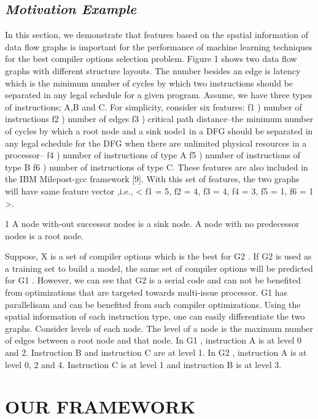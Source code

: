 \documentclass[conference]{IEEEtran}
\begin{document}
\subsection{\textit{Motivation Example}}
In this section, we demonstrate that features based on the spatial information of data flow graphs is important for the performance of machine learning techniques for the best compiler options selection problem. Figure 1 shows two data flow graphs with different structure layouts. The number besides an edge is latency which is the minimum number of cycles by which two instructions should be separated in any legal schedule for a given program. Assume, we have three types of instructions; A,B and C. For simplicity, consider six features: f1 ) number of instructions f2 ) number of edges f3 ) critical path distance–the minimum number of cycles by which a root node and a sink node1 in a DFG should be separated in any legal schedule for the DFG when there are unlimited physical resources in a processor– f4 ) number of instructions of type A  f5 ) number of instructions of type B f6 ) number of instructions of type C. These features are also included in the IBM Milepost-gcc framework [9]. With this set of features, the two graphs will have same feature vector ,i.e., < f1 = 5, f2 = 4, f3 = 4, f4 = 3, f5 = 1, f6 = 1 >.\par

1 A node with-out successor nodes is a sink node. A node with no predecessor nodes is a root node.


Suppose, X is a set of compiler options which is the best for G2 . If G2 is used as a training set to build a model, the same set of compiler options will be predicted for G1 . However, we can see that G2 is a serial code and can not be benefited from optimizations that are targeted towards multi-issue processor. G1 has parallelisam and can be benefited from such compiler optimizations. Using the spatial information of each instruction type, one can easily differentiate the two graphs. Consider levels of each node. The level of a node is the maximum number of edges between a root node and that node. In G1 , instruction A is at level 0 and 2. Instruction B and instruction C are at level 1. In G2 , instruction A is at level 0, 2 and 4. Instruction C is at level 1 and instruction B is at level 3.

\section{OUR FRAMEWORK}
\end{document}
